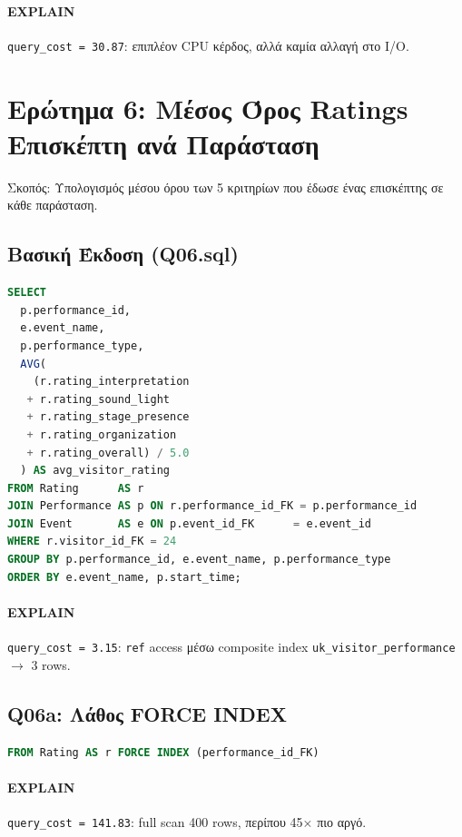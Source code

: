 \documentclass[a4paper,12pt]{article}
\begin{document}
\paragraph{EXPLAIN}  
\texttt{query\_cost = 30.87}: επιπλέον CPU κέρδος, αλλά καμία αλλαγή στο I/O.

\bigskip

\section{Ερώτημα 6: Μέσος Όρος Ratings Επισκέπτη ανά Παράσταση}
\label{sec:q6}

Σκοπός: Υπολογισμός μέσου όρου των 5 κριτηρίων που έδωσε ένας επισκέπτης σε κάθε παράσταση.

\subsection{Βασική Έκδοση (Q06.sql)}
\begin{lstlisting}[language=SQL]
SELECT
  p.performance_id,
  e.event_name,
  p.performance_type,
  AVG(
    (r.rating_interpretation
   + r.rating_sound_light
   + r.rating_stage_presence
   + r.rating_organization
   + r.rating_overall) / 5.0
  ) AS avg_visitor_rating
FROM Rating      AS r
JOIN Performance AS p ON r.performance_id_FK = p.performance_id
JOIN Event       AS e ON p.event_id_FK      = e.event_id
WHERE r.visitor_id_FK = 24
GROUP BY p.performance_id, e.event_name, p.performance_type
ORDER BY e.event_name, p.start_time;
\end{lstlisting}

\paragraph{EXPLAIN}
\texttt{query\_cost = 3.15}: \texttt{ref} access μέσω composite index \texttt{uk\_visitor\_performance} $\rightarrow$ 3 rows.

\subsection{Q06a: Λάθος FORCE INDEX}
\begin{lstlisting}[language=SQL]
FROM Rating AS r FORCE INDEX (performance_id_FK)
\end{lstlisting}

\paragraph{EXPLAIN}  
\texttt{query\_cost = 141.83}: full scan 400 rows, περίπου 45× πιο αργό.
\end{document}
